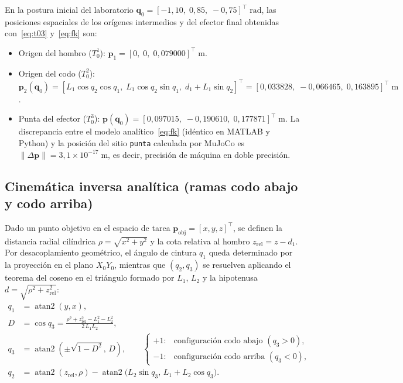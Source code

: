 \documentclass[11pt,a4paper]{article}
\newcommand{\T}{^{\!\top}}
\newcommand{\norm}[1]{\left\lVert#1\right\rVert}
\begin{document}
\begin{cajadef}
En la postura inicial del laboratorio $\bm{q}_{0}=[-1{,}10,\;0{,}85,\;-0{,}75]\T\;\text{rad}$, las posiciones espaciales de los orígenes intermedios y del efector final obtenidas con~\eqref{eq:t03} y~\eqref{eq:fk} son:
\begin{itemize}[leftmargin=*, topsep=2pt, itemsep=1pt]
\item Origen del hombro ($T_{0}^{1}$): $\bm{p}_{1}=[0,\;0,\;0{,}079000]\T\;\text{m}$.
\item Origen del codo ($T_{0}^{2}$): $\bm{p}_{2}(\bm{q}_{0})=[L_{1}\cos q_{2}\cos q_{1},\;L_{1}\cos q_{2}\sin q_{1},\;d_{1}+L_{1}\sin q_{2}]\T = [0{,}033828,\;-0{,}066465,\;0{,}163895]\T\;\text{m}$.
\item Punta del efector ($T_{0}^{3}$): $\bm{p}(\bm{q}_{0})=[0{,}097015,\;-0{,}190610,\;0{,}177871]\T\;\text{m}$. La discrepancia entre el modelo analítico~\eqref{eq:fk} (idéntico en MATLAB y Python) y la posición del sitio \texttt{punta} calculada por MuJoCo es $\norm{\Delta\bm{p}}=3{,}1\times10^{-17}\;\text{m}$, es decir, precisión de máquina en doble precisión.
\end{itemize}
\end{cajadef}

\subsection{Cinemática inversa analítica (ramas codo abajo y codo arriba)}
\label{sec:ik}

Dado un punto objetivo en el espacio de tarea $\bm{p}_{\text{obj}}=[x,y,z]\T$, se definen la distancia radial cilíndrica $\rho=\sqrt{x^{2}+y^{2}}$ y la cota relativa al hombro $z_{\text{rel}}=z-d_{1}$. Por desacoplamiento geométrico, el ángulo de cintura $q_{1}$ queda determinado por la proyección en el plano $X_{0}Y_{0}$, mientras que $(q_{2},q_{3})$ se resuelven aplicando el teorema del coseno en el triángulo formado por $L_{1}$, $L_{2}$ y la hipotenusa $d=\sqrt{\rho^{2}+z_{\text{rel}}^{2}}$:
\begin{align}
q_{1} &= \operatorname{atan2}(y,x),\label{eq:ik_q1}\\
D &= \cos q_{3} = \frac{\rho^{2}+z_{\text{rel}}^{2}-L_{1}^{2}-L_{2}^{2}}{2\,L_{1}L_{2}},\label{eq:ik_D}\\
q_{3} &= \operatorname{atan2}\!\left(\pm\sqrt{1-D^{2}},\,D\right),\qquad\begin{cases}+1: & \text{configuración codo abajo }(q_{3}>0),\\ -1: & \text{configuración codo arriba }(q_{3}<0),\end{cases}\label{eq:ik_q3}\\
q_{2} &= \operatorname{atan2}(z_{\text{rel}},\rho)-\operatorname{atan2}\!\bigl(L_{2}\sin q_{3},\,L_{1}+L_{2}\cos q_{3}\bigr).\label{eq:ik_q2}
\end{align}
\end{document}
